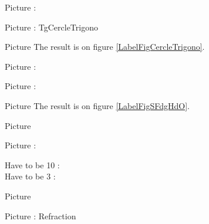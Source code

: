 

Picture : 
\begin{center}
   
\end{center}

Picture : TgCercleTrigono
\begin{center}
   
\end{center}

\clearpage

Picture 
The result is on figure \ref{LabelFigCercleTrigono}. %
\newcommand{\CaptionFigCercleTrigono}{<+Type your caption here+>}




Picture : 
\begin{center}
   
\end{center}


Picture : 
\begin{center}
   
\end{center}

\clearpage


Picture 
The result is on figure \ref{LabelFigSFdgHdO}. %
\newcommand{\CaptionFigSFdgHdO}{<+Type your caption here+>}


\clearpage

       Picture 
   \begin{center}

   \end{center}



\setcounter{page}{10}
\setcounter{section}{3}
Picture : 
\begin{center}
    Have to be 10 : \thepage\\
    Have to be 3 : \thesection\\
   
\end{center}


       Picture 
   \begin{center}

   \end{center}



Picture : Refraction
\begin{center}
   
\end{center}



